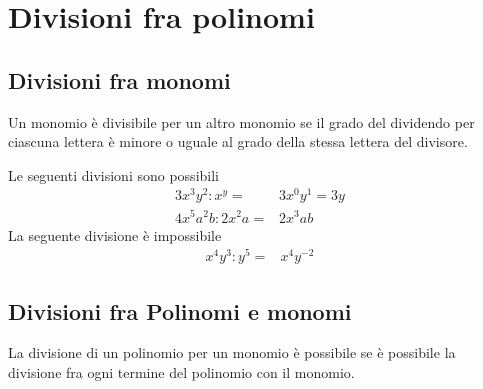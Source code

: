 \chapter{Divisioni fra polinomi}
\label{cha:Divisionipolinomi}
\minitoc
\mtcskip                                %
\minilof                                %
\mtcskip                                %
\minilot
\section{Divisioni fra monomi}
Un monomio è divisibile per un altro monomio se il grado del dividendo per ciascuna lettera è minore o uguale al grado della stessa lettera del divisore.
\begin{esempio}
Le seguenti divisioni sono possibili
\begin{align*}
3x^3y^2:x^y=&3x^0y^1=3y\\
4x^5a^2b:2x^2a=&2x^3ab
\end{align*}
La seguente divisione è impossibile
\begin{align*}
x^4y^3:y^5=&x^4y^{-2}
\end{align*}
\end{esempio}
\section{Divisioni fra Polinomi e monomi}
La divisione di un polinomio per un monomio è possibile se è possibile la divisione fra ogni termine del polinomio con il monomio.
